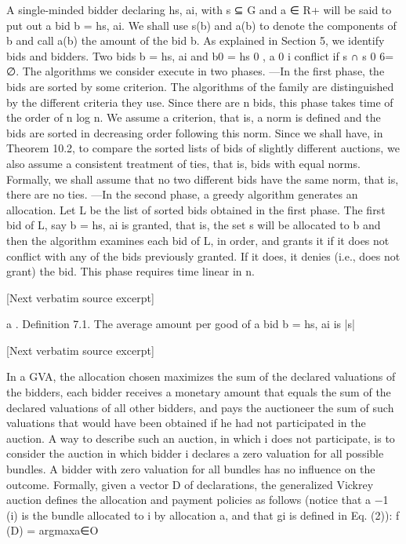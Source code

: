\documentclass[10pt]{article}
\begin{document}
\begin{ReviewVerbatim}

A single-minded bidder declaring hs, ai, with s ⊆ G and a ∈ R+ will be said to
put out a bid b = hs, ai. We shall use s(b) and a(b) to denote the components of b
and call a(b) the amount of the bid b. As explained in Section 5, we identify bids
and bidders. Two bids b = hs, ai and b0 = hs 0 , a 0 i conflict if s ∩ s 0 6= ∅.
The algorithms we consider execute in two phases.
—In the first phase, the bids are sorted by some criterion. The algorithms of the
family are distinguished by the different criteria they use. Since there are n bids,
this phase takes time of the order of n log n. We assume a criterion, that is, a norm
is defined and the bids are sorted in decreasing order following this norm. Since
we shall have, in Theorem 10.2, to compare the sorted lists of bids of slightly
different auctions, we also assume a consistent treatment of ties, that is, bids
with equal norms. Formally, we shall assume that no two different bids have the
same norm, that is, there are no ties.
—In the second phase, a greedy algorithm generates an allocation. Let L be the
list of sorted bids obtained in the first phase. The first bid of L, say b = hs, ai is
granted, that is, the set s will be allocated to b and then the algorithm examines
each bid of L, in order, and grants it if it does not conflict with any of the bids
previously granted. If it does, it denies (i.e., does not grant) the bid. This phase
requires time linear in n.

[Next verbatim source excerpt]

a
.
Definition 7.1. The average amount per good of a bid b = hs, ai is |s|

[Next verbatim source excerpt]

In a GVA, the allocation chosen maximizes the sum of the declared valuations
of the bidders, each bidder receives a monetary amount that equals the sum of the
declared valuations of all other bidders, and pays the auctioneer the sum of such
valuations that would have been obtained if he had not participated in the auction.
A way to describe such an auction, in which i does not participate, is to consider
the auction in which bidder i declares a zero valuation for all possible bundles. A
bidder with zero valuation for all bundles has no influence on the outcome.
Formally, given a vector D of declarations, the generalized Vickrey auction
defines the allocation and payment policies as follows (notice that a −1 (i) is the
bundle allocated to i by allocation a, and that gi is defined in Eq. (2)):
f (D) = argmaxa∈O


\end{ReviewVerbatim}
\end{document}
